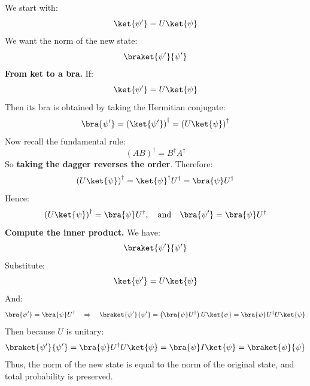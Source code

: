 \begin{remarkbox}
    \begin{remarkbox}
        We start with:
        \begin{equation*}
            \ket{\psi'} = U\ket{\psi}
        \end{equation*}
        We want the norm of the new state:
        \begin{equation*}
            \braket{\psi'}{\psi'}
        \end{equation*}
        \textbf{From ket to a bra.} If:
        \begin{equation*}
            \ket{\psi'} = U\ket{\psi}
        \end{equation*}
        Then its bra is obtained by taking the Hermitian conjugate:
        \begin{equation*}
            \bra{\psi'} = \left(\ket{\psi'}\right)^{\dagger} = \left(U\ket{\psi}\right)^{\dagger}
        \end{equation*}
        Now recall the fundamental rule:
        \begin{equation*}
            \left(AB\right)^{\dagger} = B^{\dagger}A^{\dagger}
        \end{equation*}
        So \textbf{taking the dagger reverses the order}. Therefore:
        \begin{equation*}
            \left(U\ket{\psi}\right)^{\dagger} = \ket{\psi}^{\dagger}U^{\dagger} = \bra{\psi}U^{\dagger}
        \end{equation*}
        Hence:
        \begin{equation*}
            \left(U\ket{\psi}\right)^{\dagger} = \bra{\psi}U^{\dagger}, \quad \text{and} \quad \bra{\psi'} = \bra{\psi}U^{\dagger}
        \end{equation*}
        \textbf{Compute the inner product.} We have:
        \begin{equation*}
            \braket{\psi'}{\psi'}
        \end{equation*}
        Substitute:
        \begin{equation*}
            \ket{\psi'} = U\ket{\psi}
        \end{equation*}
        And:
        \begin{equation*}
            \bra{\psi'} = \bra{\psi}U^{\dagger} \quad \Rightarrow \quad \braket{\psi'}{\psi'} = \left(\bra{\psi}U^{\dagger}\right) U\ket{\psi} = \bra{\psi}U^{\dagger}U\ket{\psi}
        \end{equation*}
        Then because $U$ is unitary:
        \begin{equation*}
            \braket{\psi'}{\psi'} = \bra{\psi}U^{\dagger}U\ket{\psi} = \bra{\psi}I\ket{\psi} = \braket{\psi}{\psi}
        \end{equation*}
        Thus, the norm of the new state is equal to the norm of the original state, and total probability is preserved.
    \end{remarkbox}


\end{remarkbox}
